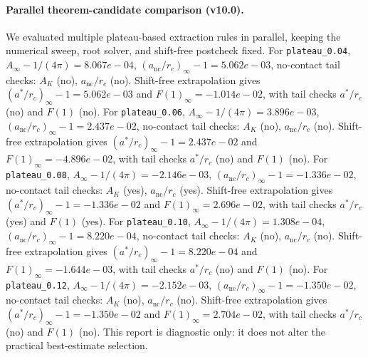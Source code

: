 \paragraph{Parallel theorem-candidate comparison (v10.0).}
We evaluated multiple plateau-based extraction rules in parallel, keeping the numerical sweep, root solver, and shift-free postcheck fixed. For \texttt{plateau_0.04}, $A_\infty-1/(4\pi)=8.067e-04$, $(a_{\mathrm{nc}}/r_c)_\infty-1=5.062e-03$, no-contact tail checks: $A_K$ (no), $a_{\mathrm{nc}}/r_c$ (no). Shift-free extrapolation gives $(a^*/r_c)_\infty-1=5.062e-03$ and $F(1)_\infty=-1.014e-02$, with tail checks $a^*/r_c$ (no) and $F(1)$ (no). For \texttt{plateau_0.06}, $A_\infty-1/(4\pi)=3.896e-03$, $(a_{\mathrm{nc}}/r_c)_\infty-1=2.437e-02$, no-contact tail checks: $A_K$ (no), $a_{\mathrm{nc}}/r_c$ (no). Shift-free extrapolation gives $(a^*/r_c)_\infty-1=2.437e-02$ and $F(1)_\infty=-4.896e-02$, with tail checks $a^*/r_c$ (no) and $F(1)$ (no). For \texttt{plateau_0.08}, $A_\infty-1/(4\pi)=-2.146e-03$, $(a_{\mathrm{nc}}/r_c)_\infty-1=-1.336e-02$, no-contact tail checks: $A_K$ (yes), $a_{\mathrm{nc}}/r_c$ (yes). Shift-free extrapolation gives $(a^*/r_c)_\infty-1=-1.336e-02$ and $F(1)_\infty=2.696e-02$, with tail checks $a^*/r_c$ (yes) and $F(1)$ (yes). For \texttt{plateau_0.10}, $A_\infty-1/(4\pi)=1.308e-04$, $(a_{\mathrm{nc}}/r_c)_\infty-1=8.220e-04$, no-contact tail checks: $A_K$ (no), $a_{\mathrm{nc}}/r_c$ (no). Shift-free extrapolation gives $(a^*/r_c)_\infty-1=8.220e-04$ and $F(1)_\infty=-1.644e-03$, with tail checks $a^*/r_c$ (no) and $F(1)$ (no). For \texttt{plateau_0.12}, $A_\infty-1/(4\pi)=-2.152e-03$, $(a_{\mathrm{nc}}/r_c)_\infty-1=-1.350e-02$, no-contact tail checks: $A_K$ (no), $a_{\mathrm{nc}}/r_c$ (no). Shift-free extrapolation gives $(a^*/r_c)_\infty-1=-1.350e-02$ and $F(1)_\infty=2.704e-02$, with tail checks $a^*/r_c$ (no) and $F(1)$ (no). This report is diagnostic only: it does not alter the practical best-estimate selection.
